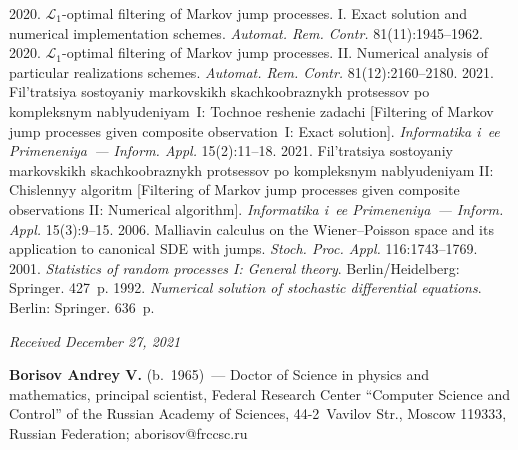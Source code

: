   \begin{multicols}{2}

\renewcommand{\bibname}{\protect\rmfamily References}

{\small\frenchspacing
 {\baselineskip=10.6pt
 \begin{thebibliography}{9}
 2020. $\mathcal{L}_1$-optimal filtering of Markov jump processes. I. Exact solution and numerical implementation schemes. 
\textit{Automat. Rem. Contr.} 81(11):1945--1962.
 2020. $\mathcal{L}_1$-optimal filtering of Markov jump processes. II. Numerical analysis of particular realizations schemes. 
\textit{Automat. Rem. Contr.} 81(12):2160--2180. 
 2021. Fil't\-ra\-tsiya so\-sto\-yaniy mar\-kov\-skikh skach\-ko\-ob\-raz\-nykh 
pro\-tses\-sov po komp\-leks\-nym nab\-lyu\-de\-ni\-yam~I: Toch\-noe re\-she\-nie za\-da\-chi 
[\mbox{Filtering} of Markov jump processes given composite observation~I: Exact solution]. 
\textit{Informatika i~ee Primeneniya~--- Inform. Appl.} 15(2):11--18.
 2021. Fil'tra\-tsiya so\-sto\-yaniy mar\-kov\-skikh skach\-ko\-ob\-raz\-nykh pro\-tses\-sov po komp\-leks\-nym nab\-lyu\-de\-ni\-yam II: Chis\-len\-nyy al\-go\-ritm 
 [Filtering of Markov jump processes given composite observations II: Numerical algorithm]. 
 \textit{Informatika i~ee Primeneniya~--- Inform. Appl.} 15(3):9--15.
 2006. Malliavin calculus on the Wiener--Poisson space and 
its application to canonical SDE with jumps. \textit{Stoch. Proc. Appl.} 116:1743--1769.
 2001. \textit{Statistics of random processes I: General theory}. Berlin/Heidelberg: Springer. 427~p.
 1992. 
\textit{Numerical solution of stochastic differential equations}. Berlin: Springer. 636~p.
 \end{thebibliography}

 }
 }

\end{multicols}

\vspace*{-8pt}

\hfill{\small\textit{Received December 27, 2021}}

\vspace*{-22pt}

\Contrl

\vspace*{-4pt}

\noindent
\textbf{Borisov Andrey V.} (b.\ 1965)~--- 
Doctor of Science in physics and mathematics, principal scientist, Federal Research Center ``Computer Science and Control'' 
of the Russian Academy of Sciences, 44-2~Vavilov Str., Moscow 119333, Russian Federation; \mbox{aborisov@frccsc.ru}

\label{end\stat}

\renewcommand{\bibname}{\protect\rm Литература}  